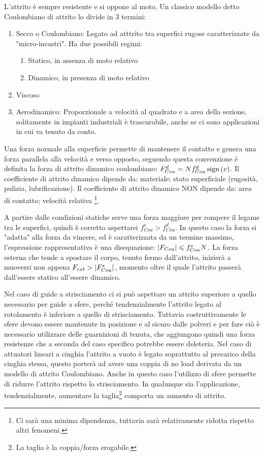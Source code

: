 L'attrito è sempre resistente e si oppone al moto.
Un classico modello detto Coulombiano di attrito lo divide in 3 termini:
\begin{enumerate}
    \item Secco o Coulombiano: Legato ad atttrito tra superfici rugose caratterizzate da "micro-incastri". Ha due possibili regimi:
    \begin{enumerate}
        \item Statico, in assenza di moto relativo
        \item Dinamico, in presenza di moto relativo
    \end{enumerate}
    \item Viscoso
    \item Aerodinamico: Proporzionale a velocità al quadrato e a area della sezione, solitamente in impianti industriali è trascurabile, anche se ci sono applicazioni in cui va tenuto da conto.
\end{enumerate}

Una forza normale alla superficie permette di mantenere il contatto e genera una forza parallela alla velocità e verso opposto, seguendo questa convenzione è definita la forza di attrito dinamico coulombiano: $F_{Cou}^d = N f_{Cou}^d \operatorname{sign}\left(v\right)$.
Il coefficiente di attrito dinamico dipende da: materiale; stato superficiale (rugosità, pulizia, lubrificazione).
Il coefficiente di attrito dinamico NON dipende da: area di contatto; velocità relativa \footnote{Ci sarà una minima dipendenza, tuttavia sarà relativamente ridotta rispetto altri fenomeni.}.

A partire dalle condizioni statiche serve una forza maggiore per rompere il legame tra le superfici, quindi è corretto aspettarsi $f_{Cou}^s>f_{Cou}^d$. In questo caso la forza si "adatta" alla forza da vincere, ed è caratterizzata da un termine massimo, l'espressione rappresentativa è una disequazione: $\left|F_{Cou}\right| \leqslant f_{Cou}^s N$.
La forza esterna che tende a spostare il corpo, tenuto fermo dall'attrito, inizierà a muoversi non appena $F_{ext}>\left|F_{Cou}^s\right|$, momento oltre il quale l'attrito passerà dall'essere statico all'essere dinamico.

Nel caso di guide a strisciamento ci si può aspettare un attrito superiore a quello necessario per guide a sfere, perché tendenzialmente l'attrito legato al rotolamento è inferiore a quello di strisciamento.
Tuttavia costruttivamente le sfere devono essere mantenute in posizione e al sicuro dalle polveri e per fare ciò è necessario utilizzare delle guarnizioni di tenuta, che aggiungono quindi una forza resistenze che a seconda del caso specifico potrebbe essere deleteria.
Nel caso di attuatori lineari a cinghia l'attrito a vuoto è legato soprattutto al precarico della cinghia stessa, questo porterà ad avere una coppia di no load derivata da un modello di attrito Coulombiano. Anche in questo caso l'utilizzo di sfere permette di ridurre l'attrito rispetto lo strisciamento.
In qualunque sia l'applicazione, tendenzialmente, aumentare la taglia\footnote{La taglia è la coppia/forza erogabile.} comporta un aumento di attrito.

